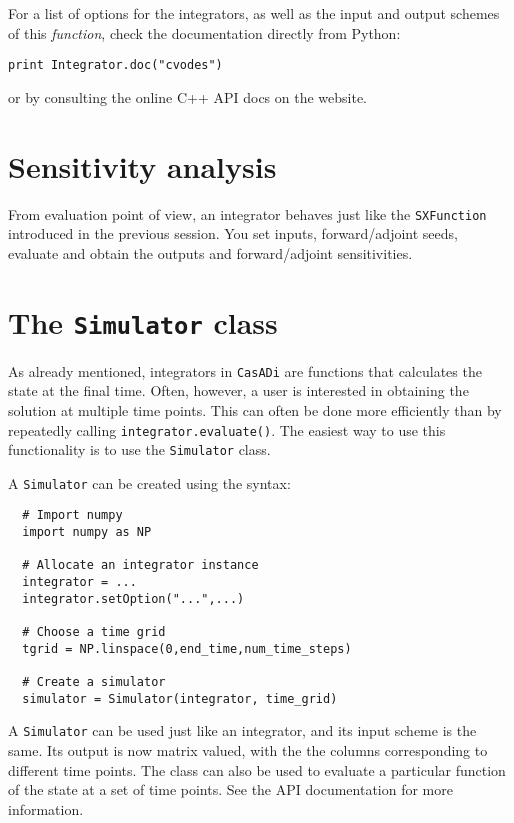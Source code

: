 \documentclass[a4paper,12pt]{book}
\newcommand{\CasADi}{\texttt{CasADi}\xspace}
\begin{document}
For a list of options for the integrators, as well as the input and output schemes of this \emph{function}, check the documentation directly from Python:
\begin{verbatim}
print Integrator.doc("cvodes")
\end{verbatim}
or by consulting the online C++ API docs on the website.

\section{Sensitivity analysis}
From evaluation point of view, an integrator behaves just like the \texttt{SXFunction} introduced in the previous session. You set inputs, forward/adjoint seeds, evaluate and obtain the outputs and forward/adjoint sensitivities.

\section{The \texttt{Simulator} class}
As already mentioned, integrators in \CasADi are functions that calculates the state at the final time. Often, however, a user is interested in obtaining the solution at multiple time points. This can often be done more efficiently than by repeatedly calling \texttt{integrator.evaluate()}. The easiest way to use this functionality is to use the \texttt{Simulator} class.

A \texttt{Simulator} can be created using the syntax:
\begin{verbatim}
  # Import numpy
  import numpy as NP

  # Allocate an integrator instance
  integrator = ...
  integrator.setOption("...",...)

  # Choose a time grid
  tgrid = NP.linspace(0,end_time,num_time_steps)

  # Create a simulator
  simulator = Simulator(integrator, time_grid)
\end{verbatim}

A \texttt{Simulator} can be used just like an integrator, and its input scheme is the same. Its output is now matrix valued, with the the columns corresponding to different time points. The class can also be used to evaluate a particular function of the state at a set of time points. See the API documentation for more information.
\end{document}
